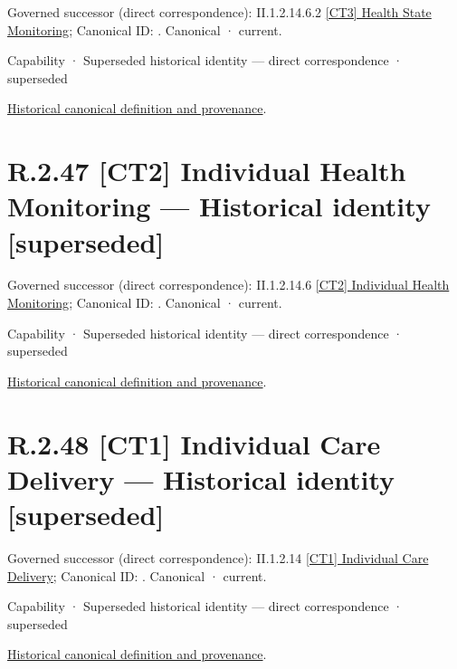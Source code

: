 {\small Governed successor (direct correspondence): II.1.2.14.6.2 \hyperref[element:d77f22909f8b47dba4cbd95982e576df]{[CT3] Health State Monitoring}; Canonical ID: \texttt{}. Canonical · current.}\par
\label{element:346f024f74b447a8b6056b9d521837ff}
{\small Capability · Superseded historical identity — direct correspondence · superseded}\par
\href{../../../../../../../continuum/strategy/capability/346f024f74b447a8b6056b9d521837ff.md}{Historical canonical definition and provenance}.\par
\section*{R.2.47 [CT2] Individual Health Monitoring — Historical identity [superseded]}
\label{navigation:R.2.47}

{\small Governed successor (direct correspondence): II.1.2.14.6 \hyperref[element:c7d0e498e1ad44138df940af2f91cd2d]{[CT2] Individual Health Monitoring}; Canonical ID: \texttt{}. Canonical · current.}\par
\label{element:31e7c27556314cafb74d040441d2dac6}
{\small Capability · Superseded historical identity — direct correspondence · superseded}\par
\href{../../../../../../../continuum/strategy/capability/31e7c27556314cafb74d040441d2dac6.md}{Historical canonical definition and provenance}.\par
\section*{R.2.48 [CT1] Individual Care Delivery — Historical identity [superseded]}
\label{navigation:R.2.48}

{\small Governed successor (direct correspondence): II.1.2.14 \hyperref[element:b964a11cde594318aa14ff935414158a]{[CT1] Individual Care Delivery}; Canonical ID: \texttt{}. Canonical · current.}\par
\label{element:162deb7e292042f78f677a14476a3a1d}
{\small Capability · Superseded historical identity — direct correspondence · superseded}\par
\href{../../../../../../../continuum/strategy/capability/162deb7e292042f78f677a14476a3a1d.md}{Historical canonical definition and provenance}.\par
